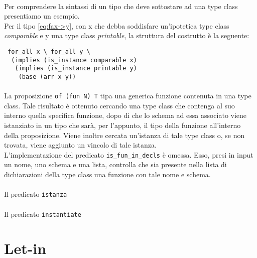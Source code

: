 \documentclass[12pt,a4paper,openright,twoside]{report}
\begin{document}
\paragraph{}
Per comprendere la sintassi di un tipo che deve sottostare ad una type class presentiamo un esempio.\\
Per il tipo \eqref{eq:fax->y}, con x che debba soddisfare un'ipotetica type class \textit{comparable} e y una type class \textit{printable}, la struttura del costrutto è la seguente:
\begin{verbatim}
 for_all x \ for_all y \
  (implies (is_instance comparable x)
   (implies (is_instance printable y)
    (base (arr x y))
\end{verbatim}

\paragraph{}
La proposizione \verb"of (fun N) T" tipa una generica funzione contenuta in una type class. Tale risultato è ottenuto cercando una type class che contenga al suo interno quella specifica funzione, dopo di che lo schema ad essa associato viene istanziato in un tipo che sarà, per l'appunto, il tipo della funzione all'interno della proposizione. Viene inoltre cercata un'istanza di tale type class o, se non trovata, viene aggiunto un vincolo di tale istanza.\\
L'implementazione del predicato \verb"is_fun_in_decls" è omessa. Esso, presi in input un nome, uno schema e una lista, controlla che sia presente nella lista di dichiarazioni della type class una funzione con tale nome e schema.

\paragraph{}
Il predicato \verb"istanza" %

\paragraph{}
Il predicato \verb"instantiate" %













\section{Let-in}
\end{document}
